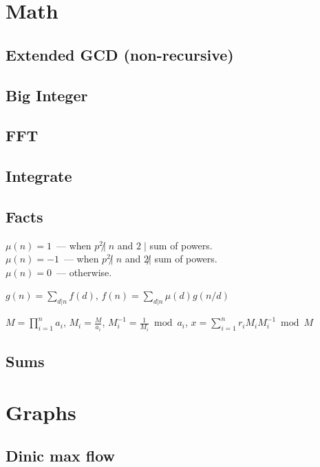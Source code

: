 \documentclass[11pt]{article}
\begin{document}
\pagestyle{fancy}
\newpage

\section{Math}
\subsection{Extended GCD (non-recursive)}

\subsection{Big Integer}

\subsection{FFT}

\subsection{Integrate}

\subsection{Facts}
$\mu(n) = 1$~--- when $p^2 \not| \;n$ and $2 \;|$ sum of powers.\\
$\mu(n) = -1$~--- when $p^2 \not| \;n$ and $2 \not|$ sum of powers.\\
$\mu(n) = 0$~--- otherwise.

$g(n) = \sum_{d | n}f(d)$, $f(n) = \sum_{d | n}\mu(d)g(n/d)$

$M={\displaystyle \prod _{{i=1}}^{n}a_{i}}$,
$M_{i}={\frac  M{a_{i}}}$,
$M_{i}^{{-1}}={\frac  1{M_{i}}}{\bmod  {a_{i}}}$,
$x=\sum_{i=1}^{n}r_{i}M_{i}M_{i}^{-1}\bmod M$

\subsection{Sums}



\section{Graphs}
\subsection{Dinic max flow}

\end{document}
